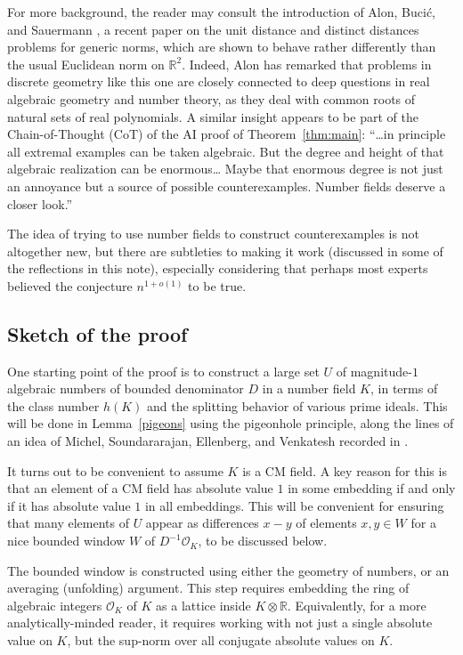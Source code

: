 \documentclass[11pt,reqno]{amsart}
\numberwithin{equation}{section}
\theoremstyle{definition}
\theoremstyle{remark}
\newcommand{\R}{\mathbb{R}}
\renewcommand{\O}{\mathcal{O}}
\begin{document}
For more background, the reader may consult the introduction of
Alon, Buci\'c, and Sauermann \cite{Alon2025Typical},
a recent paper on the unit distance and distinct distances problems
for generic norms, which are shown to behave rather differently than the usual Euclidean norm on $\R^2$.
Indeed,
Alon has remarked that
problems in discrete geometry like this one are
closely connected to deep questions in real algebraic geometry and number
theory, as they deal with common roots of natural sets of real
polynomials.
A similar insight appears to be part of the
Chain-of-Thought (CoT)
of the AI proof of Theorem~\ref{thm:main}:
``\dots in principle all extremal examples can be taken algebraic.  But the degree and height of that algebraic realization can be enormous\dots
Maybe that enormous degree is not just an annoyance but a source of possible counterexamples.  Number fields deserve a closer look.''

The idea of trying to use number fields
to construct counterexamples is not altogether new,
but there are subtleties to making it work
(discussed in some of the reflections in this note),
especially considering that perhaps most experts believed the conjecture $n^{1+o(1)}$ to be true.

\subsection{Sketch of the proof}

One starting point of the proof is to construct a large set $U$ of magnitude-$1$
algebraic numbers of bounded denominator $D$ in a number field $K$, in terms of
the class number $h(K)$ and
the splitting behavior of various prime ideals.
This will be done in Lemma~\ref{pigeons}
using the pigeonhole principle,
along the lines of an idea of
Michel, Soundararajan,
Ellenberg, and Venkatesh
recorded in \cite{EllenbergVenkatesh2007Reflection}.

It turns out to be convenient to assume $K$ is a CM field.
A key reason for this is that an element of a CM field has absolute value $1$
in some embedding if and only if it
has absolute value $1$ in all embeddings.
This will be convenient for ensuring that many elements of $U$
appear as differences $x-y$ of elements $x,y\in W$ for a nice bounded window $W$ of $D^{-1}\O_K$, to be discussed below.

The bounded window is constructed using either the geometry of numbers,
or an averaging (unfolding) argument.
This step requires embedding the ring of algebraic integers $\O_K$ of $K$ as a lattice inside $K\otimes \R$.
Equivalently, for a more analytically-minded reader,
it requires working with not just a single absolute value on $K$,
but the sup-norm over all conjugate absolute values on $K$.
\end{document}
